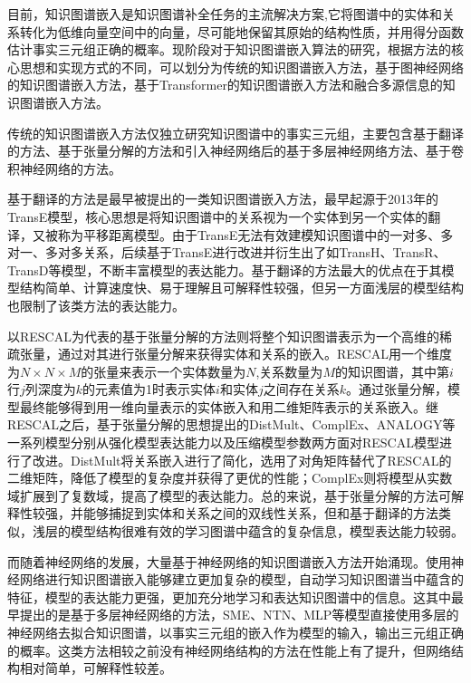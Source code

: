 目前，知识图谱嵌入是知识图谱补全任务的主流解决方案,它将图谱中的实体和关系转化为低维向量空间中的向量，尽可能地保留其原始的结构性质，并用得分函数估计事实三元组正确的概率。现阶段对于知识图谱嵌入算法的研究，根据方法的核心思想和实现方式的不同，可以划分为传统的知识图谱嵌入方法，基于图神经网络的知识图谱嵌入方法，基于Transformer的知识图谱嵌入方法和融合多源信息的知识图谱嵌入方法。

传统的知识图谱嵌入方法仅独立研究知识图谱中的事实三元组，主要包含基于翻译的方法、基于张量分解的方法和引入神经网络后的基于多层神经网络方法、基于卷积神经网络的方法。

基于翻译的方法是最早被提出的一类知识图谱嵌入方法，最早起源于2013年的TransE模型，核心思想是将知识图谱中的关系视为一个实体到另一个实体的翻译，又被称为平移距离模型。由于TransE无法有效建模知识图谱中的一对多、多对一、多对多关系，后续基于TransE进行改进并衍生出了如TransH、TransR、TransD等模型，不断丰富模型的表达能力。基于翻译的方法最大的优点在于其模型结构简单、计算速度快、易于理解且可解释性较强，但另一方面浅层的模型结构也限制了该类方法的表达能力。

以RESCAL为代表的基于张量分解的方法则将整个知识图谱表示为一个高维的稀疏张量，通过对其进行张量分解来获得实体和关系的嵌入。RESCAL用一个维度为$N\times N\times M$的张量来表示一个实体数量为$N$,关系数量为$M$的知识图谱，其中第$i$行$j$列深度为$k$的元素值为1时表示实体$i$和实体$j$之间存在关系$k$。通过张量分解，模型最终能够得到用一维向量表示的实体嵌入和用二维矩阵表示的关系嵌入。继RESCAL之后，基于张量分解的思想提出的DistMult、ComplEx、ANALOGY等一系列模型分别从强化模型表达能力以及压缩模型参数两方面对RESCAL模型进行了改进。DistMult将关系嵌入进行了简化，选用了对角矩阵替代了RESCAL的二维矩阵，降低了模型的复杂度并获得了更优的性能；ComplEx则将模型从实数域扩展到了复数域，提高了模型的表达能力。总的来说，基于张量分解的方法可解释性较强，并能够捕捉到实体和关系之间的双线性关系，但和基于翻译的方法类似，浅层的模型结构很难有效的学习图谱中蕴含的复杂信息，模型表达能力较弱。

而随着神经网络的发展，大量基于神经网络的知识图谱嵌入方法开始涌现。使用神经网络进行知识图谱嵌入能够建立更加复杂的模型，自动学习知识图谱当中蕴含的特征，模型的表达能力更强，更加充分地学习和表达知识图谱中的信息。这其中最早提出的是基于多层神经网络的方法，SME、NTN、MLP等模型直接使用多层的神经网络去拟合知识图谱，以事实三元组的嵌入作为模型的输入，输出三元组正确的概率。这类方法相较之前没有神经网络结构的方法在性能上有了提升，但网络结构相对简单，可解释性较差。

